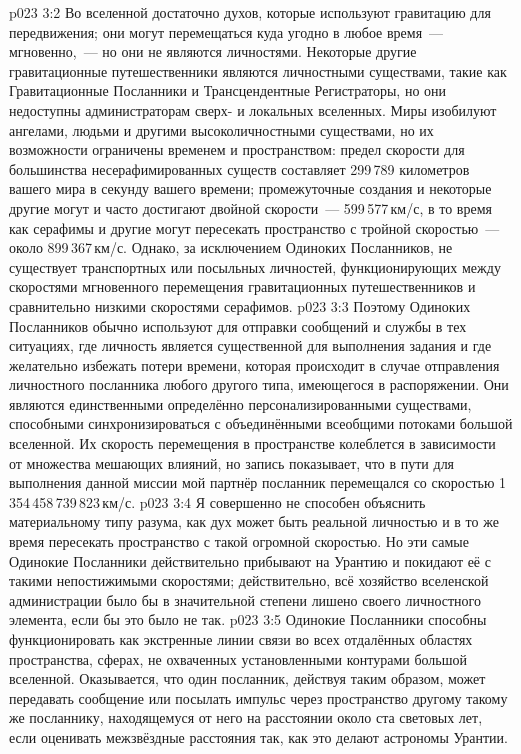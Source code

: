 \vs p023 3:2 \pc Во вселенной достаточно духов, которые используют гравитацию для передвижения; они могут перемещаться куда угодно в любое время~--- мгновенно,~--- но они не являются личностями. Некоторые другие гравитационные путешественники являются личностными существами, такие как Гравитационные Посланники и Трансцендентные Регистраторы, но они недоступны администраторам сверх\hyp{} и локальных вселенных. Миры изобилуют ангелами, людьми и другими высоколичностными существами, но их возможности ограничены временем и пространством: предел скорости для большинства несерафимированных существ составляет 299\,789 километров вашего мира в секунду вашего времени; промежуточные создания и некоторые другие могут и часто достигают двойной скорости~--- 599\,577\,км/с, в то время как серафимы и другие могут пересекать пространство с тройной скоростью~--- около 899\,367\,км/с. Однако, за исключением Одиноких Посланников, не существует транспортных или посыльных личностей, функционирующих между скоростями мгновенного перемещения гравитационных путешественников и сравнительно низкими скоростями серафимов.
\vs p023 3:3 Поэтому Одиноких Посланников обычно используют для отправки сообщений и службы в тех ситуациях, где личность является существенной для выполнения задания и где желательно избежать потери времени, которая происходит в случае отправления личностного посланника любого другого типа, имеющегося в распоряжении. Они являются единственными определённо персонализированными существами, способными синхронизироваться с объединёнными всеобщими потоками большой вселенной. Их скорость перемещения в пространстве колеблется в зависимости от множества мешающих влияний, но запись показывает, что в пути для выполнения данной миссии мой партнёр посланник перемещался со скоростью 1\,354\,458\,739\,823\,км/с.
\vs p023 3:4 Я совершенно не способен объяснить материальному типу разума, как дух может быть реальной личностью и в то же время пересекать пространство с такой огромной скоростью. Но эти самые Одинокие Посланники действительно прибывают на Урантию и покидают её с такими непостижимыми скоростями; действительно, всё хозяйство вселенской администрации было бы в значительной степени лишено своего личностного элемента, если бы это было не так.
\vs p023 3:5 \pc Одинокие Посланники способны функционировать как экстренные линии связи во всех отдалённых областях пространства, сферах, не охваченных установленными контурами большой вселенной. Оказывается, что один посланник, действуя таким образом, может передавать сообщение или посылать импульс через пространство другому такому же посланнику, находящемуся от него на расстоянии около ста световых лет, если оценивать межзвёздные расстояния так, как это делают астрономы Урантии.
